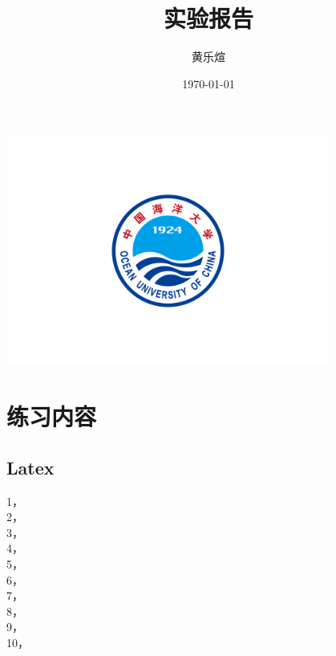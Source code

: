 \documentclass[UTF8]{ctexart}
\title{实验报告}
\author{黄乐煊}
\date{\today}
\begin{document}
\fancyhf{}
\fancyfoot[C]{\thepage}

\begin{titlingpage} 
    \centering
    \includegraphics[width=0.8\textwidth]{logo.png}

    {\Huge \thetitle\par}
    \vspace{1cm}
    {\Large \theauthor\par} 
    \vfill
    {\large \thedate\par} 
\end{titlingpage}

\newpage
\section{练习内容}

\subsection{Latex}

\begin{flushleft}
1，\\
2，\\
3，\\
4，\\
5，\\
6，\\
7，\\
8，\\
9，\\
10，\\
\end{flushleft}
\end{document}
